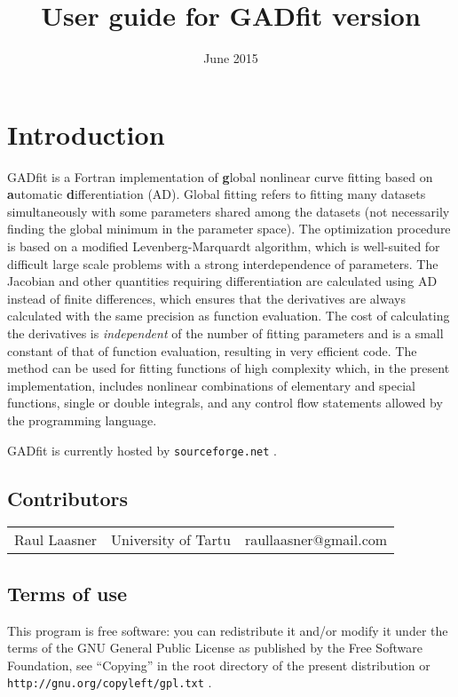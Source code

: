 \documentclass{article}
\title{User guide for GADfit version \version}
\date{June 2015}
\begin{document}
\maketitle
\tableofcontents

\section{Introduction}

GADfit is a Fortran implementation of \textbf{g}lobal nonlinear curve
fitting based on \textbf{a}utomatic \textbf{d}ifferentiation
(AD). Global fitting refers to fitting many datasets simultaneously
with some parameters shared among the datasets (not necessarily
finding the global minimum in the parameter space). The optimization
procedure is based on a modified Levenberg-Marquardt algorithm, which
is well-suited for difficult large scale problems with a strong
interdependence of parameters. The Jacobian and other quantities
requiring differentiation are calculated using AD instead of finite
differences, which ensures that the derivatives are always calculated
with the same precision as function evaluation. The cost of
calculating the derivatives is \textit{independent} of the number of
fitting parameters and is a small constant of that of function
evaluation, resulting in very efficient code. The method can be used
for fitting functions of high complexity which, in the present
implementation, includes nonlinear combinations of elementary and
special functions, single or double integrals, and any control flow
statements allowed by the programming language.

GADfit is currently hosted by \texttt{sourceforge.net} .

\subsection{Contributors}

\begin{tabular}{lll}
  Raul Laasner & University of Tartu & raullaasner@gmail.com \\
\end{tabular}

\subsection{Terms of use}

This program is free software: you can redistribute it and/or modify
it under the terms of the GNU General Public License as published by
the Free Software Foundation, see ``Copying'' in the root directory of
the present distribution or \texttt{http://gnu.org/copyleft/gpl.txt} .
\end{document}
